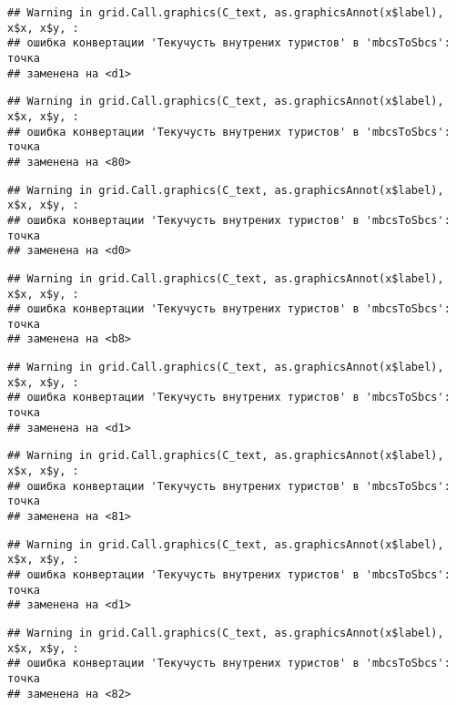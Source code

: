 \documentclass[
]{article}
\begin{document}
\begin{verbatim}
## Warning in grid.Call.graphics(C_text, as.graphicsAnnot(x$label), x$x, x$y, :
## ошибка конвертации 'Текучусть внутрених туристов' в 'mbcsToSbcs': точка
## заменена на <d1>
\end{verbatim}

\begin{verbatim}
## Warning in grid.Call.graphics(C_text, as.graphicsAnnot(x$label), x$x, x$y, :
## ошибка конвертации 'Текучусть внутрених туристов' в 'mbcsToSbcs': точка
## заменена на <80>
\end{verbatim}

\begin{verbatim}
## Warning in grid.Call.graphics(C_text, as.graphicsAnnot(x$label), x$x, x$y, :
## ошибка конвертации 'Текучусть внутрених туристов' в 'mbcsToSbcs': точка
## заменена на <d0>
\end{verbatim}

\begin{verbatim}
## Warning in grid.Call.graphics(C_text, as.graphicsAnnot(x$label), x$x, x$y, :
## ошибка конвертации 'Текучусть внутрених туристов' в 'mbcsToSbcs': точка
## заменена на <b8>
\end{verbatim}

\begin{verbatim}
## Warning in grid.Call.graphics(C_text, as.graphicsAnnot(x$label), x$x, x$y, :
## ошибка конвертации 'Текучусть внутрених туристов' в 'mbcsToSbcs': точка
## заменена на <d1>
\end{verbatim}

\begin{verbatim}
## Warning in grid.Call.graphics(C_text, as.graphicsAnnot(x$label), x$x, x$y, :
## ошибка конвертации 'Текучусть внутрених туристов' в 'mbcsToSbcs': точка
## заменена на <81>
\end{verbatim}

\begin{verbatim}
## Warning in grid.Call.graphics(C_text, as.graphicsAnnot(x$label), x$x, x$y, :
## ошибка конвертации 'Текучусть внутрених туристов' в 'mbcsToSbcs': точка
## заменена на <d1>
\end{verbatim}

\begin{verbatim}
## Warning in grid.Call.graphics(C_text, as.graphicsAnnot(x$label), x$x, x$y, :
## ошибка конвертации 'Текучусть внутрених туристов' в 'mbcsToSbcs': точка
## заменена на <82>
\end{verbatim}
\end{document}
